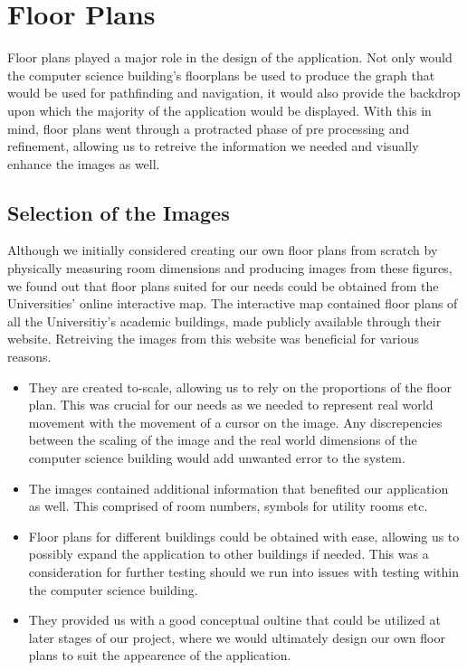 \documentclass[main.tex]{subfiles}
\begin{document}
\chapter{Floor Plans}
    
Floor plans played a major role in the design of the application. Not only would the computer science building's floorplans be used to produce the graph that would be used for pathfinding and navigation, it would also provide the backdrop upon which the majority of the application would be displayed. With this in mind, floor plans went through a protracted phase of pre processing and refinement, allowing us to retreive the information we needed and visually enhance the images as well.

\section{Selection of the Images}

Although we initially considered creating our own floor plans from scratch by physically measuring room dimensions and producing images from these figures, we found out that floor plans suited for our needs could be obtained from the Universities' online interactive map. The interactive map contained floor plans of all the Universitiy's academic buildings, made publicly available through their website. Retreiving the images from this website was beneficial for various reasons.

\begin{itemize}

\item They are created to-scale, allowing us to rely on the proportions of the floor plan. This was crucial for our needs as we needed to represent real world movement with the movement of a cursor on the image. Any discrepencies between the scaling of the image and the real world dimensions of the computer science building would add unwanted error to the system.

\item The images contained additional information that benefited our application as well. This comprised of room numbers, symbols for utility rooms etc.

\item Floor plans for different buildings could be obtained with ease, allowing us to possibly expand the application to other buildings if needed. This was a consideration for further testing should we run into issues with testing within the computer science building.

\item They provided us with a good conceptual oultine that could be utilized at later stages of our project, where we would ultimately design our own floor plans to suit the appearence of the application.
\end{itemize}
		
\end{document}
